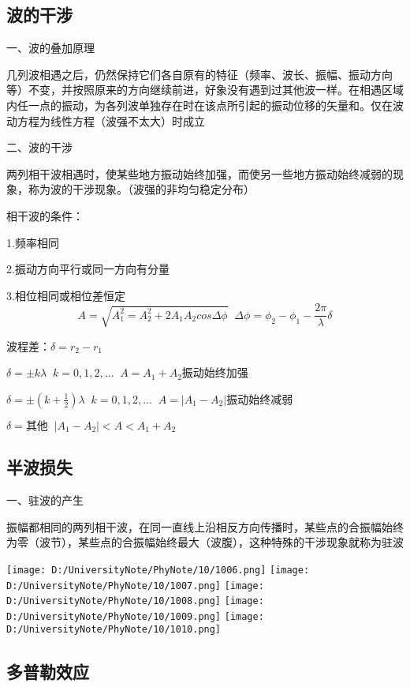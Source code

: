 \documentclass[UTF8]{article}
\begin{document}
\subsection{波的干涉}

    一、波的叠加原理

    几列波相遇之后，仍然保持它们各自原有的特征（频率、波长、振幅、振动方向等）不变，并按照原来的方向继续前进，好象没有遇到过其他波一样。在相遇区域内任一点的振动，为各列波单独存在时在该点所引起的振动位移的矢量和。仅在波动方程为线性方程（波强不太大）时成立

    二、波的干涉

    两列相干波相遇时，使某些地方振动始终加强，而使另一些地方振动始终减弱的现象，称为波的干涉现象。（波强的非均匀稳定分布）

    相干波的条件：

    \;\;1.频率相同

    \;\;2.振动方向平行或同一方向有分量

    \;\;3.相位相同或相位差恒定
    \[A = \sqrt{A_1^2 = A_2^2+ 2A_1A_2cos\Delta\phi}\;\;\Delta\phi = \phi_2 - \phi_1 - \frac{2\pi}{\lambda}\delta\]

    波程差：$\delta = r_2 - r_1$

    $\delta = \pm k\lambda\;\;k = 0, 1, 2,\dots\;\;A = A_1 + A_2$\;\;振动始终加强

    $\delta = \pm(k + \frac{1}{2})\lambda\;\;k = 0, 1, 2,\dots\;\;A = \vert A_1 - A_2\lvert $\;\;振动始终减弱

    $\delta = \mbox{其他}\;\;\vert A_1 - A_2 \lvert < A < A_1 + A_2$

\subsection{半波损失}

    一、驻波的产生

    振幅都相同的两列相干波，在同一直线上沿相反方向传播时，某些点的合振幅始终为零（波节），某些点的合振幅始终最大（波腹），这种特殊的干涉现象就称为驻波

    \texttt{[image: D:/UniversityNote/PhyNote/10/1006.png]}
    \texttt{[image: D:/UniversityNote/PhyNote/10/1007.png]}
    \texttt{[image: D:/UniversityNote/PhyNote/10/1008.png]}
    \texttt{[image: D:/UniversityNote/PhyNote/10/1009.png]}
    \texttt{[image: D:/UniversityNote/PhyNote/10/1010.png]}

\subsection{多普勒效应}
\end{document}

